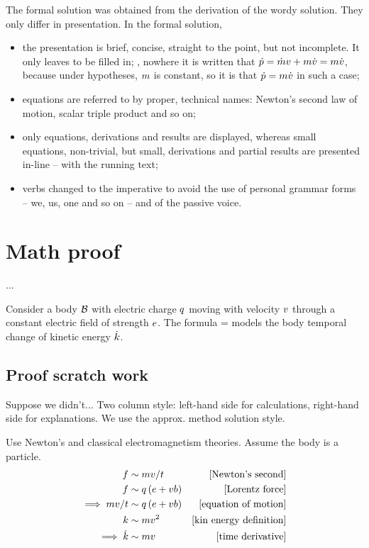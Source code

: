 The formal solution was obtained from the derivation of the wordy solution. They only differ in presentation. In the formal solution,
%
\begin{itemize}
%
\item the presentation is brief, concise, straight to the point, but not incomplete. It only leaves  to be filled in; \eg, nowhere it is written that $\dot{p} = \dot{m}v + m\dot{v} = m\dot{v}$, because under hypotheses, $m$ is constant, so it is  that $\dot{p} = m\dot{v}$ in such a case;
%
\item equations are referred to by proper, technical names: Newton's second law of motion, scalar triple product and so on;
%
\item only  equations, derivations and results are displayed, whereas small equations, non-trivial, but small, derivations and partial results are presented in-line -- with the running text;
%
\item verbs changed to the imperative to avoid the use of personal grammar forms -- we, us, one and so on -- and of the passive voice.
%
\end{itemize}


\section{Math proof}
%
... \cite[chap. 1]{lehman:2011}

Consider a body $\mathcal{B}$ with electric charge $q$ moving with velocity $v$ through a constant electric field of strength $e$. The formula
%
\beq
  \dt\ekin = \echarge\efield\iprod\vel
\eeq
%
models the body temporal change of kinetic energy $\dot{k}$.


\subsection{Proof scratch work}
%
Suppose we didn't... Two column style: left-hand side for calculations, right-hand side for explanations. We use the approx. method solution style.

Use Newton's and classical electromagnetism theories. Assume the body is a particle. 
%
\begin{align*}
%
  \force &\sim \mass\vel/t                           & \eqtxt{Newton's second} \\
  \force &\sim \echarge\parth{\efield + \vel\mfield} & \eqtxt{Lorentz force} \\
  \implies
  \mass\vel/t &\sim \echarge\parth{\efield + \vel\mfield} & \eqtxt{equation of motion}\\
  \ekin &\sim\mass\vel^2 & \eqtxt{kin energy definition} \\
  \implies
  \dt\ekin &\sim\mass\vel & \eqtxt{time derivative} \\
%
\end{align*}
%




